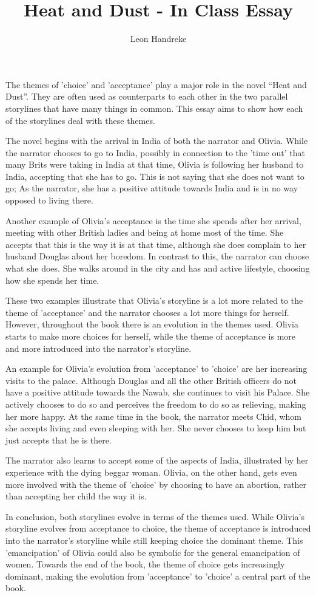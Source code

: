 \documentclass[11pt]{article}
\title{Heat and Dust - In Class Essay}
\author{Leon Handreke}
\date{}                                           %
\begin{document}
\doublespacing

\maketitle
{}\selectfont

The themes of 'choice' and 'acceptance' play a major role in the novel ``Heat and Dust''. They are often used as counterparts to each other in the two parallel storylines that have many things in common. This essay aims to show how each of the storylines deal with these themes.

The novel begins with the arrival in India of both the narrator and Olivia. While the narrator chooses to go to India, possibly in connection to the 'time out' that many Brits were taking in India at that time, Olivia is following her husband to India, accepting that she has to go. This is not saying that she does not want to go; As the narrator, she has a positive attitude towards India and is in no way opposed to living there.

Another example of Olivia's acceptance is the time she spends after her arrival, meeting with other British ladies and being at home most of the time. She accepts that this is the way it is at that time, although she does complain to her husband Douglas about her boredom. In contrast to this, the narrator can choose what she does. She walks around in the city and has and active lifestyle, choosing how she spends her time.

These two examples illustrate that Olivia's storyline is a lot more related to the theme of 'acceptance' and the narrator chooses a lot more things for herself. However, throughout the book there is an evolution in the themes used. Olivia starts to make more choices for herself, while the theme of acceptance is more and more introduced into the narrator's storyline.

An example for Olivia's evolution from 'acceptance' to 'choice' are her increasing visits to the palace. Although Douglas and all the other British officers do not have a positive attitude towards the Nawab, she continues to visit his Palace. She actively chooses to do so and perceives the freedom to do so as relieving, making her more happy. At the same time in the book, the narrator meets Chid, whom she accepts living and even sleeping with her. She never chooses to keep him but just accepts that he is there.

The narrator also learns to accept some of the aspects of India, illustrated by her experience with the dying beggar woman. Olivia, on the other hand, gets even more involved with the theme of 'choice' by choosing to have an abortion, rather than accepting her child the way it is.

In conclusion, both storylines evolve in terms of the themes used. While Olivia's storyline evolves from acceptance to choice, the theme of acceptance is introduced into the narrator's storyline while still keeping choice the dominant theme. This 'emancipation' of Olivia could also be symbolic for the general emancipation of women. Towards the end of the book, the theme of choice gets increasingly dominant, making the evolution from 'acceptance' to 'choice' a central part of the book.
\end{document}
